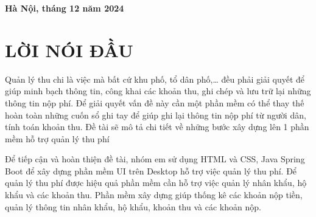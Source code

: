 \documentclass{article}
\begin{document}
\begin{titlepage}
\begin{Border}
\begin{center}
        \vspace{1.5cm}
        \fontsize{14pt}{0pt}\selectfont \textbf{Hà Nội, tháng 12 năm 2024}
    \end{center}
\end{Border}
\end{titlepage}
\newpage


\captionsetup{labelformat=empty} %
\tableofcontents %
\cleardoublepage

\section*{LỜI NÓI ĐẦU}
Quản lý thu chi là việc mà bất cứ khu phố, tổ dân phố,… đều phải giải quyết để
giúp minh bạch thông tin, công khai các khoản thu, ghi chép và lưu trữ lại những
thông tin nộp phí. Để giải quyết vấn đề này cần một phần mềm có thể thay thế hoàn
toàn những cuốn sổ ghi tay để giúp ghi lại thông tin nộp phí từ người dân, tính toán
khoản thu. Đề tài sẽ mô tả chi tiết về những bước xây dựng lên 1 phần mềm hỗ trợ
quản lý thu phí 

Để tiếp cận và hoàn thiện đề tài, nhóm em sử dụng HTML và CSS, Java Spring 
Boot để xây dựng phần mềm UI trên Desktop hỗ trợ việc quản lý thu phí. Để quản lý thu phí được hiệu quả phần mềm cần hỗ trợ việc quản lý nhân khẩu, hộ khẩu và các khoản thu. Phần
mềm xây dựng giúp thống kê các khoản nộp tiền, quản lý thông tin nhân khẩu, hộ khẩu, khoản thu và các khoản nộp.
\newpage

\end{document}
